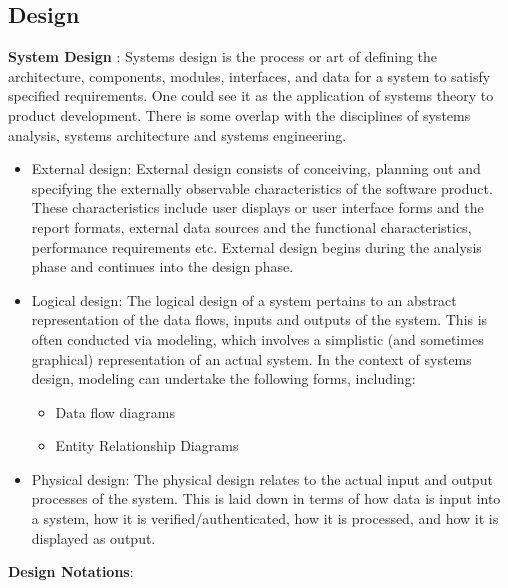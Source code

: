 \newpage
\subsection{Design}
{\bf System Design} : Systems design is the process or art of defining 
the architecture, components, modules, interfaces, and data for a 
system to satisfy specified requirements. One could see it as the 
application of systems theory to product development. There is some 
overlap with the disciplines of systems analysis, systems architecture 
and systems engineering.
\begin{itemize}
\item  External design: External design consists of conceiving, 
planning out and specifying the externally observable characteristics 
of the software product. These characteristics include user displays 
or user interface forms and the report formats, external data sources 
and the functional characteristics, performance requirements etc. 
External design begins during the analysis phase
and continues into the design phase.
\item  Logical design: The logical design of a system pertains to an 
abstract representation of the data flows, inputs and outputs of the 
system. This is often conducted via modeling, which involves a 
simplistic (and sometimes graphical) representation of an actual 
system. In the context of systems design, modeling can undertake the 
following forms, including:
\begin{itemize}
\item Data flow diagrams
\item Entity Relationship Diagrams
\end{itemize}
\item  Physical design: The physical design relates to the actual 
input and output processes of the system. This is laid down in terms 
of how data is input into a system, how it is verified/authenticated, 
how it is processed, and how it is displayed as output.
\end{itemize}
{\bf Design Notations}:\\

